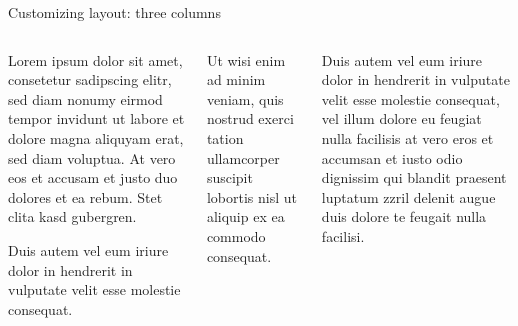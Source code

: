\documentclass[10pt,english,ignorenonframetext,]{beamer}
\begin{document}
\begin{frame}{Customizing layout: three columns}

\vspace*{-1em}\begin{columns}[T]
	\begin{column}[t]{0.33\textwidth}

Lorem ipsum dolor sit amet, consetetur sadipscing elitr, sed diam nonumy
eirmod tempor invidunt ut labore et dolore magna aliquyam erat, sed diam
voluptua. At vero eos et accusam et justo duo dolores et ea rebum. Stet
clita kasd gubergren.

Duis autem vel eum iriure dolor in hendrerit in vulputate velit esse
molestie consequat.

	\end{column}
	\begin{column}[t]{0.33\textwidth}

Ut wisi enim ad minim veniam, quis nostrud exerci tation ullamcorper
suscipit lobortis nisl ut aliquip ex ea commodo consequat.

	\end{column}
	\begin{column}[t]{0.33\textwidth}

Duis autem vel eum iriure dolor in hendrerit in vulputate velit esse
molestie consequat, vel illum dolore eu feugiat nulla facilisis at vero
eros et accumsan et iusto odio dignissim qui blandit praesent luptatum
zzril delenit augue duis dolore te feugait nulla facilisi.

	\end{column}
\end{columns}

\end{frame}
\end{document}
